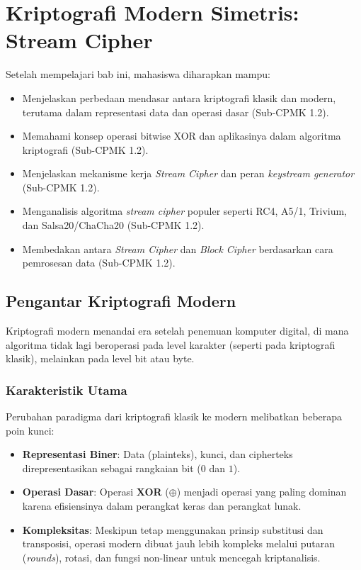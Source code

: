 \documentclass[../main.tex]{subfiles}
\begin{document}
\chapter{Kriptografi Modern Simetris: Stream Cipher}

\begin{learningoutcome}
Setelah mempelajari bab ini, mahasiswa diharapkan mampu:
\begin{itemize}
    \item Menjelaskan perbedaan mendasar antara kriptografi klasik dan modern, terutama dalam representasi data dan operasi dasar (Sub-CPMK 1.2).
    \item Memahami konsep operasi bitwise XOR dan aplikasinya dalam algoritma kriptografi (Sub-CPMK 1.2).
    \item Menjelaskan mekanisme kerja \textit{Stream Cipher} dan peran \textit{keystream generator} (Sub-CPMK 1.2).
    \item Menganalisis algoritma \textit{stream cipher} populer seperti RC4, A5/1, Trivium, dan Salsa20/ChaCha20 (Sub-CPMK 1.2).
    \item Membedakan antara \textit{Stream Cipher} dan \textit{Block Cipher} berdasarkan cara pemrosesan data (Sub-CPMK 1.2).
\end{itemize}
\end{learningoutcome}

\section{Pengantar Kriptografi Modern}
Kriptografi modern menandai era setelah penemuan komputer digital, di mana algoritma tidak lagi beroperasi pada level karakter (seperti pada kriptografi klasik), melainkan pada level bit atau byte.

\subsection{Karakteristik Utama}
Perubahan paradigma dari kriptografi klasik ke modern melibatkan beberapa poin kunci:
\begin{itemize}
    \item \textbf{Representasi Biner}: Data (plainteks), kunci, dan cipherteks direpresentasikan sebagai rangkaian bit ($0$ dan $1$).
    \item \textbf{Operasi Dasar}: Operasi \textbf{XOR} ($\oplus$) menjadi operasi yang paling dominan karena efisiensinya dalam perangkat keras dan perangkat lunak.
    \item \textbf{Kompleksitas}: Meskipun tetap menggunakan prinsip substitusi dan transposisi, operasi modern dibuat jauh lebih kompleks melalui putaran (\textit{rounds}), rotasi, dan fungsi non-linear untuk mencegah kriptanalisis.
\end{itemize}
\end{document}
